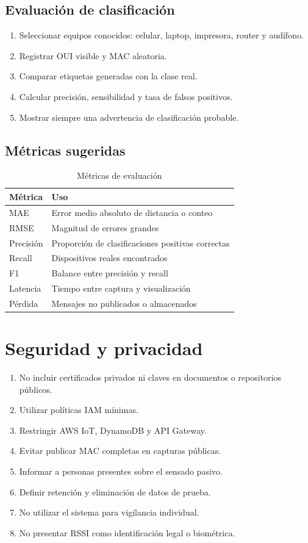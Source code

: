 \documentclass[12pt,a4paper]{article}
\begin{document}
\subsection{Evaluación de clasificación}
\begin{enumerate}
\item Seleccionar equipos conocidos: celular, laptop, impresora, router y audífono.
\item Registrar OUI visible y MAC aleatoria.
\item Comparar etiquetas generadas con la clase real.
\item Calcular precisión, sensibilidad y tasa de falsos positivos.
\item Mostrar siempre una advertencia de clasificación probable.
\end{enumerate}

\subsection{Métricas sugeridas}
\begin{table}[htbp]
\centering
\centering
\caption{Métricas de evaluación}
\begin{tabularx}{\textwidth}{@{}p{3cm}X@{}}
\toprule
Métrica & Uso \\
\midrule
MAE & Error medio absoluto de distancia o conteo \\
RMSE & Magnitud de errores grandes \\
Precisión & Proporción de clasificaciones positivas correctas \\
Recall & Dispositivos reales encontrados \\
F1 & Balance entre precisión y recall \\
Latencia & Tiempo entre captura y visualización \\
Pérdida & Mensajes no publicados o almacenados \\
\bottomrule
\end{tabularx}
\end{table}

\section{Seguridad y privacidad}
\begin{enumerate}
\item No incluir certificados privados ni claves en documentos o repositorios públicos.
\item Utilizar políticas IAM mínimas.
\item Restringir AWS IoT, DynamoDB y API Gateway.
\item Evitar publicar MAC completas en capturas públicas.
\item Informar a personas presentes sobre el sensado pasivo.
\item Definir retención y eliminación de datos de prueba.
\item No utilizar el sistema para vigilancia individual.
\item No presentar RSSI como identificación legal o biométrica.
\end{enumerate}
\end{document}
